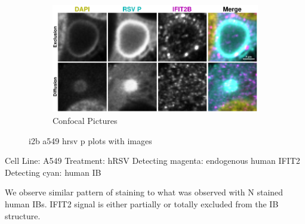 \begin{figure}
    \begin{subfigure}{1\textwidth}
        \includegraphics[width=1\linewidth]{10. Chapter 5/Figs/01. Infection/02. IFIT2B/06. i2b a549 hrsv p.pdf} 
        \caption[]{Confocal Pictures}
    \end{subfigure}
    \caption[i2b a549 hrsv p plots with images]{i2b a549 hrsv p plots with images}
    \label{fig:i2b a549 hrsv p plots with images}
\end{figure}

Cell Line: A549 \newline
Treatment: hRSV \newline
Detecting magenta: endogenous human IFIT2  \newline
Detecting cyan: human IB  \newline

We observe similar pattern of staining to what was observed with N stained human IBs. IFIT2 signal is either partially or totally excluded from the IB structure.


